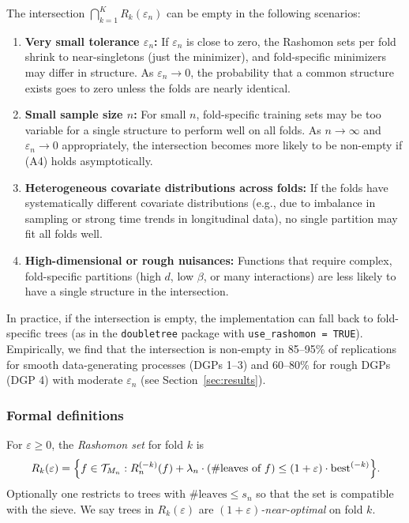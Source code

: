 \documentclass[12pt]{article}
\begin{document}
\begin{remark}
\label{rem:intersection-empty}
The intersection $\bigcap_{k=1}^K R_k(\varepsilon_n)$ can be empty in the following scenarios:
\begin{enumerate}
\item \textbf{Very small tolerance $\varepsilon_n$:} If $\varepsilon_n$ is close to zero, the Rashomon sets per fold shrink to near-singletons (just the minimizer), and fold-specific minimizers may differ in structure. As $\varepsilon_n \to 0$, the probability that a common structure exists goes to zero unless the folds are nearly identical.
\item \textbf{Small sample size $n$:} For small $n$, fold-specific training sets may be too variable for a single structure to perform well on all folds. As $n \to \infty$ and $\varepsilon_n \to 0$ appropriately, the intersection becomes more likely to be non-empty if (A4) holds asymptotically.
\item \textbf{Heterogeneous covariate distributions across folds:} If the folds have systematically different covariate distributions (e.g., due to imbalance in sampling or strong time trends in longitudinal data), no single partition may fit all folds well.
\item \textbf{High-dimensional or rough nuisances:} Functions that require complex, fold-specific partitions (high $d$, low $\beta$, or many interactions) are less likely to have a single structure in the intersection.
\end{enumerate}
In practice, if the intersection is empty, the implementation can fall back to fold-specific trees (as in the \texttt{doubletree} package with \texttt{use\_rashomon = TRUE}). Empirically, we find that the intersection is non-empty in 85--95\% of replications for smooth data-generating processes (DGPs 1--3) and 60--80\% for rough DGPs (DGP 4) with moderate $\varepsilon_n$ (see Section~\ref{sec:results}).
\end{remark}

\subsubsection{Formal definitions}

\begin{definition}
\label{def:rashomon-fold}
For $\varepsilon \ge 0$, the \emph{Rashomon set} for fold $k$ is
\[
R_k(\varepsilon) = \Bigl\{ f \in \mathcal{T}_{M_n} : R_n^{(-k)}(f) + \lambda_n \cdot (\#\text{leaves of } f) \le (1+\varepsilon) \cdot \text{best}^{(-k)} \Bigr\}.
\]
Optionally one restricts to trees with $\#\text{leaves} \le s_n$ so that the set is compatible with the sieve. We say trees in $R_k(\varepsilon)$ are \emph{$(1+\varepsilon)$-near-optimal} on fold $k$.
\end{definition}
\end{document}
